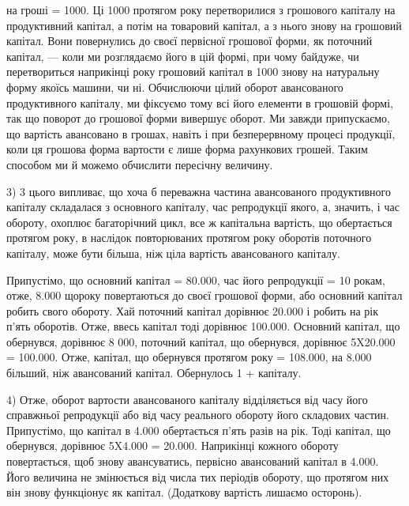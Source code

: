\parcont{}  %
на гроші  = 1000. Ці 1000 протягом року
перетворилися з грошового капіталу на продуктивний капітал, а потім на
товаровий капітал, а з нього знову на грошовий капітал. Вони повернулись
до своєї первісної грошової форми, як поточний капітал, — коли ми
розглядаємо його в цій формі, при чому байдуже, чи перетвориться наприкінці
року грошовий капітал в 1000 знову на натуральну
форму якоїсь машини, чи ні. Обчислюючи цілий оборот авансованого продуктивного
капіталу, ми фіксуємо тому всі його елементи в грошовій формі,
так що поворот до грошової форми вивершує оборот. Ми завжди припускаємо,
що вартість авансовано в грошах, навіть і при безперервному
процесі продукції, коли ця грошова форма вартости є лише форма
рахункових грошей. Таким способом ми й можемо обчислити пересічну
величину.

3) 3 цього випливає, що хоча б переважна частина авансованого
продуктивного капіталу складалася з основного капіталу, час репродукції
якого, а, значить, і час обороту, охоплює багаторічний цикл, все ж капітальна
вартість, що обертається протягом року, в наслідок повторюваних
протягом року оборотів поточного капіталу, може бути більша, ніж ціла
вартість авансованого капіталу.

Припустімо, що основний капітал = 80.000, час його репродукції
= 10 рокам, отже, 8.000 щороку повертаються до своєї
грошової форми, або основний капітал робить  свого обороту. Хай
поточний капітал дорівнює 20.000 і робить на рік п’ять оборотів.
Отже, ввесь капітал тоді дорівнює 100.000. Основний
капітал, що обернувся, дорівнює 8 000, поточний капітал, що
обернувся, дорівнює 5X20.000 = 100.000. Отже, капітал, що
обернувся протягом року = 108.000, на 8.000 більший,
ніж авансований капітал. Обернулось 1 +  капіталу.

4) Отже, оборот вартости авансованого капіталу відділяється
від часу його справжньої репродукції або від часу реального обороту
його складових частин. Припустімо, що капітал в 4.000 обертається
п’ять разів на рік. Тоді капітал, що обернувся, дорівнює
5X4.000 = 20.000. Наприкінці кожного обороту повертається,
щоб знову авансуватись, первісно авансований капітал в 4.000.
Його величина не змінюється від числа тих періодів обороту, що
протягом них він знову функціонує як капітал. (Додаткову вартість
лишаємо осторонь).

